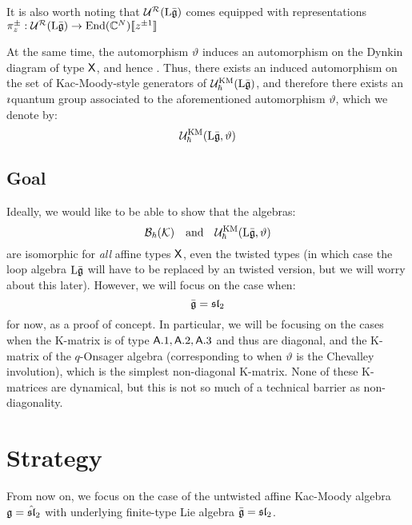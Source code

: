            It is also worth noting that $\mathcal{U}^{\mathcal{R}}(\mathrm{L} \bar{\mathfrak{g}})$ comes equipped with representations $\pi_z^{\pm}: \mathcal{U}^{\mathcal{R}}(\mathrm{L} \bar{\mathfrak{g}}) \to \operatorname{End}(\mathbb{C}^N)[\![z^{\pm 1}]\!]$

            At the same time, the automorphism $\vartheta$ induces an automorphism on the Dynkin diagram of type $\mathsf{X}$, and hence . Thus, there exists an induced automorphism on the set of Kac-Moody-style generators of $\mathcal{U}_{\hbar}^{\mathrm{KM}}(\mathrm{L} \bar{\mathfrak{g}})$, and therefore there exists an $\imath$quantum group associated to the aforementioned automorphism $\vartheta$, which we denote by:
                $$\mathcal{U}_{\hbar}^{\mathrm{KM}}(\mathrm{L} \bar{\mathfrak{g}}, \vartheta)$$
            
        \subsection{Goal}
            Ideally, we would like to be able to show that the algebras:
                $$\mathcal{B}_{\hbar}(\mathcal{K}) \quad \text{and} \quad \mathcal{U}_{\hbar}^{\mathrm{KM}}(\mathrm{L} \bar{\mathfrak{g}}, \vartheta)$$
            are isomorphic for \textit{all} affine types $\mathsf{X}$, even the twisted types (in which case the loop algebra $\mathrm{L} \bar{\mathfrak{g}}$ will have to be replaced by an twisted version, but we will worry about this later). However, we will focus on the case when:
                $$\bar{\mathfrak{g}} = \mathfrak{sl}_2$$
            for now, as a proof of concept. In particular, we will be focusing on the cases when the K-matrix is of type $\mathsf{A}.1, \mathsf{A}.2, \mathsf{A}.3$ and thus are diagonal, and the K-matrix of the $q$-Onsager algebra (corresponding to when $\vartheta$ is the Chevalley involution), which is the simplest non-diagonal K-matrix. None of these K-matrices are dynamical, but this is not so much of a technical barrier as non-diagonality.

    \section{Strategy}
        From now on, we focus on the case of the untwisted affine Kac-Moody algebra $\mathfrak{g} = \hat{\mathfrak{sl}}_2$ with underlying finite-type Lie algebra $\bar{\mathfrak{g}} = \mathfrak{sl}_2$.

